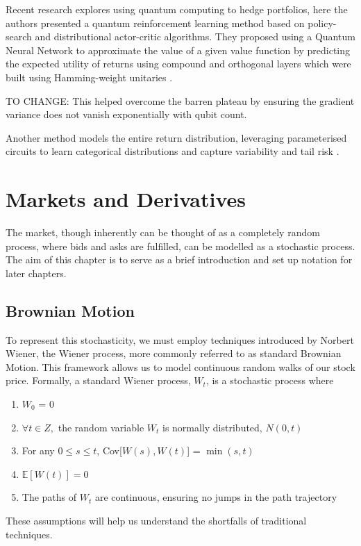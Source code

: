 \documentclass[12pt]{article}
\newcommand{\newp}
    {
    \vskip 0.5cm 
  }
\numberwithin{equation}{section}
\begin{document}
\newp
Recent research explores using quantum computing to 
hedge portfolios, here the authors presented a quantum reinforcement learning 
method based on policy-search and distributional actor-critic algorithms. 
They proposed using a Quantum Neural Network to approximate the value of a 
given value function by predicting the expected utility of returns using compound 
and orthogonal layers which were built using Hamming-weight
unitaries \autocite{kerenidis_classical_2022}. 
\newp TO CHANGE:
This helped overcome the barren 
plateau by ensuring the gradient 
variance does not vanish exponentially with qubit count. 
\newp
Another method models 
the entire return distribution, leveraging parameterised circuits to learn categorical 
distributions and capture variability and tail risk 
\autocite{cherrat_quantum_2023,dasgupta_loading_2022}.
\newpage
\section{Markets and Derivatives}
The market, though inherently can be thought of as a completely random process,
where bids and asks are fulfilled, can be modelled as a stochastic process. The 
aim of this chapter is to serve as a brief introduction and set up notation for 
later chapters. 

\subsection{Brownian Motion}
To represent this stochasticity, we must employ techniques introduced by Norbert 
Wiener, the Wiener process, more commonly referred to as standard Brownian Motion. 
This framework allows us to model continuous random 
walks of our stock price\autocite{brownianmotion}.
Formally, a standard Wiener process, $W_t$, is a stochastic 
process where 
\begin{enumerate}
  \item $W_0$ = 0
  \item $\forall t \in Z,$ the random variable $W_t$ is normally distributed, $N(0,t)$ 
  \item For any $0\leq s\leq t$, Cov[$W(s),W(t)$] = $\min(s,t)$
  \item $\mathbb{E}[W(t)]=0$
  \item The paths of $W_t$ are continuous, ensuring no jumps in the path trajectory
\end{enumerate}
These assumptions will help us understand the shortfalls of traditional techniques.
\end{document}
